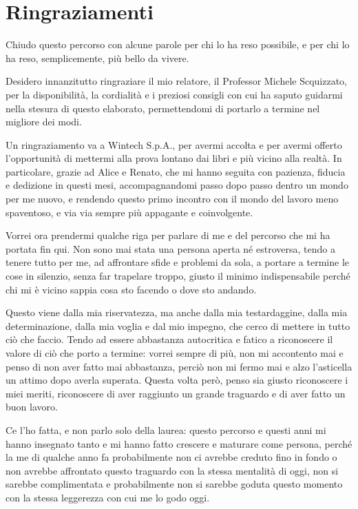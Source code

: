 \clearpage
{}
{}

\pagestyle{empty}

\chapter*{Ringraziamenti}
\thispagestyle{empty}
\begingroup
\setlength{\parskip}{0.6\baselineskip}
\setlength{\parindent}{0pt}
Chiudo questo percorso con alcune parole per chi lo ha reso possibile, e per chi lo ha reso, semplicemente, più bello da vivere.

Desidero innanzitutto ringraziare il mio relatore, il Professor Michele Scquizzato, per la disponibilità, la cordialità e i preziosi consigli con cui ha saputo guidarmi nella 
stesura di questo elaborato, permettendomi di portarlo a termine nel migliore dei modi.

Un ringraziamento va a Wintech S.p.A., per avermi accolta e per avermi offerto l'opportunità di mettermi alla prova lontano dai libri e più vicino alla realtà. 
In particolare, grazie ad Alice e Renato, che mi hanno seguita con pazienza, fiducia e dedizione in questi mesi, accompagnandomi passo dopo passo dentro un mondo per me nuovo, 
e rendendo questo primo incontro con il mondo del lavoro meno spaventoso, e via via sempre più appagante e coinvolgente.

Vorrei ora prendermi qualche riga per parlare di me e del percorso che mi ha portata fin qui. Non sono mai stata una persona aperta né estroversa, tendo a tenere tutto per me, 
ad affrontare sfide e problemi da sola, a portare a termine le cose in silenzio, senza far trapelare troppo, giusto il minimo indispensabile perché chi mi è vicino sappia 
cosa sto facendo o dove sto andando.

Questo viene dalla mia riservatezza, ma anche dalla mia testardaggine, dalla mia determinazione, dalla mia voglia e dal mio impegno, che cerco di mettere in tutto ciò che faccio. 
Tendo ad essere abbastanza autocritica e fatico a riconoscere il valore di ciò che porto a termine: vorrei sempre di più, non mi accontento mai e penso di non 
aver fatto mai abbastanza, perciò non mi fermo mai e alzo l'asticella un attimo dopo averla superata. 
Questa volta però, penso sia giusto riconoscere i miei meriti, riconoscere di aver raggiunto un grande traguardo e di aver fatto un buon lavoro.

Ce l'ho fatta, e non parlo solo della laurea: questo percorso e questi anni mi hanno insegnato tanto e mi hanno fatto crescere e maturare come persona, perché la me di 
qualche anno fa probabilmente non ci avrebbe creduto fino in fondo o non avrebbe affrontato questo traguardo con la stessa mentalità di oggi, non si sarebbe complimentata e 
probabilmente non si sarebbe goduta questo momento con la stessa leggerezza con cui me lo godo oggi.

